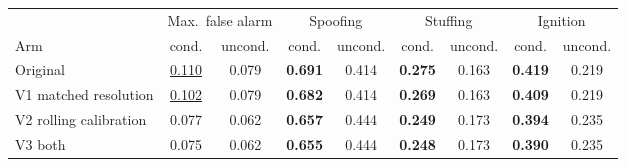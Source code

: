 \begin{tabular}{lcccccccc}
\toprule
& \multicolumn{2}{c}{Max.\ false alarm} & \multicolumn{2}{c}{Spoofing} & \multicolumn{2}{c}{Stuffing} & \multicolumn{2}{c}{Ignition} \\
\cmidrule(lr){2-3}\cmidrule(lr){4-5}\cmidrule(lr){6-7}\cmidrule(lr){8-9}
Arm & cond. & uncond. & cond. & uncond. & cond. & uncond. & cond. & uncond. \\
\midrule
Original & \underline{0.110} & 0.079 & \textbf{0.691} & 0.414 & \textbf{0.275} & 0.163 & \textbf{0.419} & 0.219 \\
V1 matched resolution & \underline{0.102} & 0.079 & \textbf{0.682} & 0.414 & \textbf{0.269} & 0.163 & \textbf{0.409} & 0.219 \\
V2 rolling calibration & 0.077 & 0.062 & \textbf{0.657} & 0.444 & \textbf{0.249} & 0.173 & \textbf{0.394} & 0.235 \\
V3 both & 0.075 & 0.062 & \textbf{0.655} & 0.444 & \textbf{0.248} & 0.173 & \textbf{0.390} & 0.235 \\
\bottomrule
\end{tabular}
